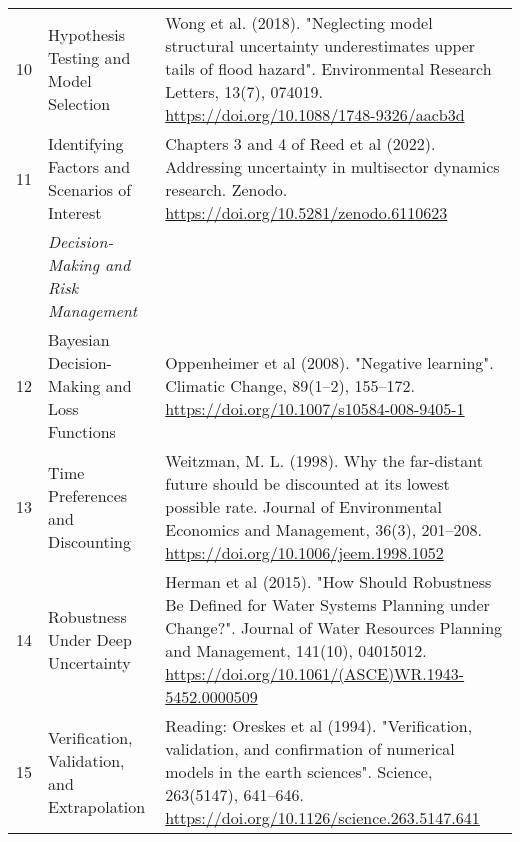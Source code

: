 \documentclass[12pt,a4paper]{article}
\begin{document}
\begin{longtable}{r | p{1.5in} | p{3.5in}}
10 & Hypothesis Testing and Model Selection & Wong et al. (2018). "Neglecting model structural uncertainty underestimates upper tails of flood hazard". Environmental Research Letters, 13(7), 074019. \href{https://doi.org/10.1088/1748-9326/aacb3d}{https://doi.org/10.1088/1748-9326/aacb3d} \\
11 & Identifying Factors and Scenarios of Interest & Chapters 3 and 4 of Reed et al (2022). Addressing uncertainty in multisector dynamics research. Zenodo. \href{https://doi.org/10.5281/zenodo.6110623}{https://doi.org/10.5281/zenodo.6110623} \\
\midrule
 & \emph{Decision-Making and Risk Management} &  \\
12 & Bayesian Decision-Making and Loss Functions & Oppenheimer et al (2008). "Negative learning". Climatic Change, 89(1--2), 155--172. \href{https://doi.org/10.1007/s10584-008-9405-1}{https://doi.org/10.1007/s10584-008-9405-1} \\
13 & Time Preferences and Discounting & Weitzman, M. L. (1998). Why the far-distant future should be discounted at its lowest possible rate. Journal of Environmental Economics and Management, 36(3), 201--208. \href{https://doi.org/10.1006/jeem.1998.1052}{https://doi.org/10.1006/jeem.1998.1052} \\
14 & Robustness Under Deep Uncertainty & Herman et al (2015). "How Should Robustness Be Defined for Water Systems Planning under Change?". Journal of Water Resources Planning and Management, 141(10), 04015012. \href{https://doi.org/10.1061/(ASCE)WR.1943-5452.0000509}{https://doi.org/10.1061/(ASCE)WR.1943-5452.0000509} \\
15 & Verification, Validation, and Extrapolation & Reading: Oreskes et al (1994). "Verification, validation, and confirmation of numerical models in the earth sciences". Science, 263(5147), 641--646. \href{https://doi.org/10.1126/science.263.5147.641}{https://doi.org/10.1126/science.263.5147.641} \\
\bottomrule
\end{longtable}
\end{document}
